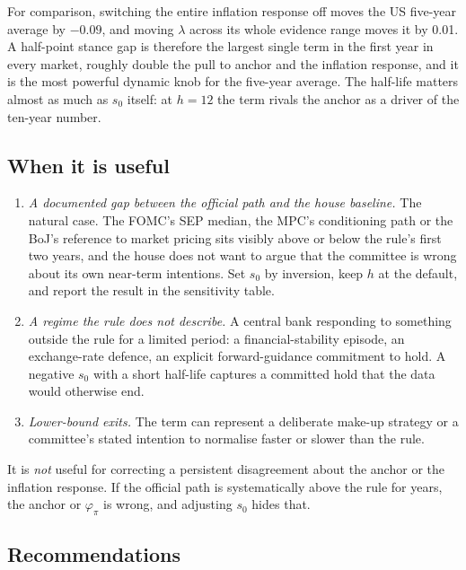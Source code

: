 \documentclass[11pt,a4paper]{article}
\begin{document}
For comparison, switching the entire inflation response off moves the US five-year average by $-0.09$, and moving $\lambda$ across its whole evidence range moves it by 0.01. A half-point stance gap is therefore the largest single term in the first year in every market, roughly double the pull to anchor and the inflation response, and it is the most powerful dynamic knob for the five-year average. The half-life matters almost as much as $s_0$ itself: at $h=12$ the term rivals the anchor as a driver of the ten-year number.

\subsection{When it is useful}

\begin{enumerate}
\item \emph{A documented gap between the official path and the house baseline.} The natural case. The FOMC's SEP median, the MPC's conditioning path or the BoJ's reference to market pricing sits visibly above or below the rule's first two years, and the house does not want to argue that the committee is wrong about its own near-term intentions. Set $s_0$ by inversion, keep $h$ at the default, and report the result in the sensitivity table.
\item \emph{A regime the rule does not describe.} A central bank responding to something outside the rule for a limited period: a financial-stability episode, an exchange-rate defence, an explicit forward-guidance commitment to hold. A negative $s_0$ with a short half-life captures a committed hold that the data would otherwise end.
\item \emph{Lower-bound exits.} The term can represent a deliberate make-up strategy or a committee's stated intention to normalise faster or slower than the rule.
\end{enumerate}

It is \emph{not} useful for correcting a persistent disagreement about the anchor or the inflation response. If the official path is systematically above the rule for years, the anchor or $\varphi_\pi$ is wrong, and adjusting $s_0$ hides that.

\subsection{Recommendations}
\end{document}
